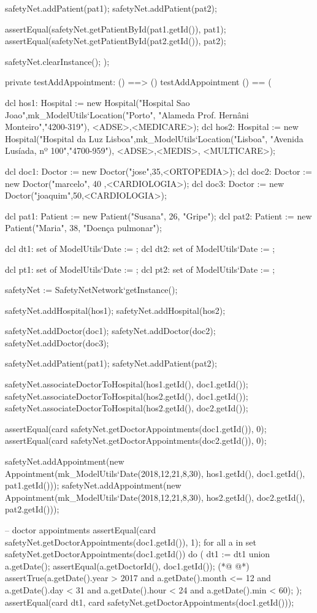 \begin{vdmpp}[breaklines=true]
  safetyNet.addPatient(pat1);
  safetyNet.addPatient(pat2);
  
  assertEqual(safetyNet.getPatientById(pat1.getId()), pat1);
  assertEqual(safetyNet.getPatientById(pat2.getId()), pat2);
 
  safetyNet.clearInstance();
);

private testAddAppointment: () ==> ()
 testAddAppointment () == (
 
  dcl hos1: Hospital := new Hospital("Hospital Sao Joao",mk_ModelUtils`Location("Porto", "Alameda Prof. Hernâni Monteiro","4200-319"), {<ADSE>,<MEDICARE>});
  dcl hos2: Hospital := new Hospital("Hospital da Luz Lisboa",mk_ModelUtils`Location("Lisboa", "Avenida Lusíada, nº 100","4700-959"), {<ADSE>,<MEDIS>, <MULTICARE>});
  
  dcl doc1: Doctor := new Doctor("jose",35,<ORTOPEDIA>);
  dcl doc2: Doctor := new Doctor("marcelo", 40 ,<CARDIOLOGIA>);
  dcl doc3: Doctor := new Doctor("joaquim",50,<CARDIOLOGIA>);
  
  dcl pat1: Patient := new Patient("Susana", 26, "Gripe");
  dcl pat2: Patient := new Patient("Maria", 38, "Doença pulmonar");
  
  dcl dt1: set of ModelUtils`Date := {};
  dcl dt2: set of ModelUtils`Date := {};
  
  dcl pt1: set of ModelUtils`Date := {};
  dcl pt2: set of ModelUtils`Date := {};
  
  safetyNet := SafetyNetNetwork`getInstance();
   
  safetyNet.addHospital(hos1);
  safetyNet.addHospital(hos2);
  
  safetyNet.addDoctor(doc1);
  safetyNet.addDoctor(doc2);
  safetyNet.addDoctor(doc3);
  
  safetyNet.addPatient(pat1);
  safetyNet.addPatient(pat2);

  safetyNet.associateDoctorToHospital(hos1.getId(), doc1.getId());
  safetyNet.associateDoctorToHospital(hos2.getId(), doc1.getId());
  safetyNet.associateDoctorToHospital(hos2.getId(), doc2.getId());

  assertEqual(card safetyNet.getDoctorAppointments(doc1.getId()), 0);
  assertEqual(card safetyNet.getDoctorAppointments(doc2.getId()), 0);

  safetyNet.addAppointment(new Appointment(mk_ModelUtils`Date(2018,12,21,8,30), hos1.getId(), doc1.getId(), pat1.getId()));
  safetyNet.addAppointment(new Appointment(mk_ModelUtils`Date(2018,12,21,8,30), hos2.getId(), doc2.getId(), pat2.getId()));

  -- doctor appointments
  assertEqual(card safetyNet.getDoctorAppointments(doc1.getId()), 1);
  for all a in set safetyNet.getDoctorAppointments(doc1.getId()) do (
   dt1 := dt1 union {a.getDate()};
   assertEqual(a.getDoctorId(), doc1.getId());
(*@
\label{testRemoveAppointment:664}
@*)
   assertTrue(a.getDate().year > 2017 and a.getDate().month <= 12 and a.getDate().day < 31 and a.getDate().hour < 24 and a.getDate().min < 60);
  );
  assertEqual(card dt1, card safetyNet.getDoctorAppointments(doc1.getId()));
  

\end{vdmpp}
